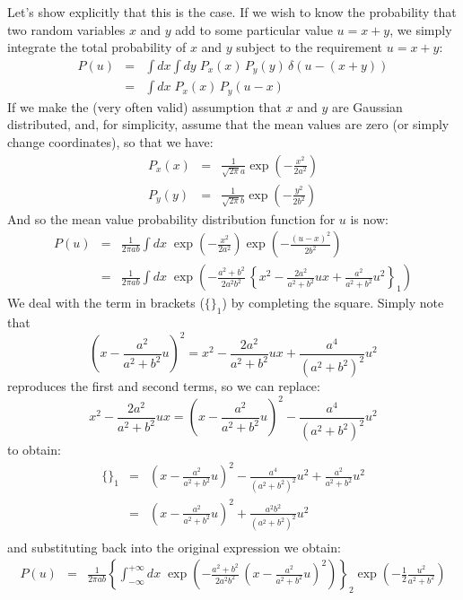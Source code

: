 \documentclass[12pt,oneside]{book}
\begin{document}
Let's show explicitly that this is the case.  If we wish to know the
probability that two random variables $x$ and $y$ add to some
particular value $u = x + y$, we simply integrate the total
probability of $x$ and $y$ subject to the requirement $u = x + y$:
\begin{eqnarray*}
P(u) &=& \int dx \int dy \; P_x(x) \, P_y(y) \, \delta\left(u-(x+y)\right) \\
        &=& \int dx \; P_x(x) \, P_y(u-x)
\end{eqnarray*}
If we make the (very often valid) assumption that $x$ and $y$ are Gaussian distributed, and, for simplicity, assume that the mean values are zero (or simply change coordinates), so that we have:
\begin{eqnarray*}
P_x(x) &=& \frac{1}{\sqrt{2\pi} a} \exp\left( -\frac{x^2}{2a^2} \right) \\
P_y(y) &=& \frac{1}{\sqrt{2\pi} b} \exp\left( -\frac{y^2}{2b^2} \right) 
\end{eqnarray*}
And so the mean value probability distribution function for $u$ is now:
\begin{eqnarray*}
P(u) &=& \frac{1}{2\pi a b} \int dx \; \exp\left( -\frac{x^2}{2a^2}\right) \exp\left( -\frac{(u-x)^2}{2b^2}\right) \\
&=& \frac{1}{2\pi a b} \int dx \; \exp \left( -\frac{a^2+b^2}{2a^2b^2} \, \left\{ x^2 - \frac{2a^2}{a^2+b^2}ux + \frac{a^2}{a^2+b^2}u^2\right\}_1 \right) 
\end{eqnarray*}
We deal with the term in brackets ($\{\}_1$) by completing the square.  Simply note that
\begin{equation}
\left(x-\frac{a^2}{a^2+b^2}u\right)^2 = x^2-\frac{2a^2}{a^2+b^2}ux + \frac{a^4}{(a^2+b^2)^2}u^2
\end{equation}
reproduces the first and second terms, so we can replace:
\begin{equation}
x^2-\frac{2a^2}{a^2+b^2}ux  = \left(x-\frac{a^2}{a^2+b^2}u\right)^2 -  \frac{a^4}{(a^2+b^2)^2}u^2
\end{equation}
to obtain:
\begin{eqnarray*}
\{\}_1 &=& \left(x-\frac{a^2}{a^2+b^2}u\right)^2 -  \frac{a^4}{(a^2+b^2)^2}u^2 + \frac{a^2}{a^2+b^2}u^2\\
&=& \left(x-\frac{a^2}{a^2+b^2}u\right)^2 + \frac{a^2b^2}{(a^2+b^2)^2}u^2\\
\end{eqnarray*}
and substituting back into the original expression we obtain:
\begin{eqnarray*}
P(u) &=& \frac{1}{2\pi a b} \left\{ \int_{-\infty}^{+\infty} dx \;  \exp \left( -\frac{a^2+b^2}{2a^2b^2} \, \left(x-\frac{a^2}{a^2+b^2}u\right)^2 \right) \right\}_2
\exp \left( -\frac{1}{2} \frac{u^2}{a^2+b^2} \right)
\end{eqnarray*}
\end{document}
